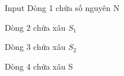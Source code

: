 Input
Dòng 1 chứa số nguyên N  

   Dòng 2 chứa xâu $S_{1}$

   Dòng 3 chứa xâu $S_{2}$

   Dòng 4 chứa xâu S